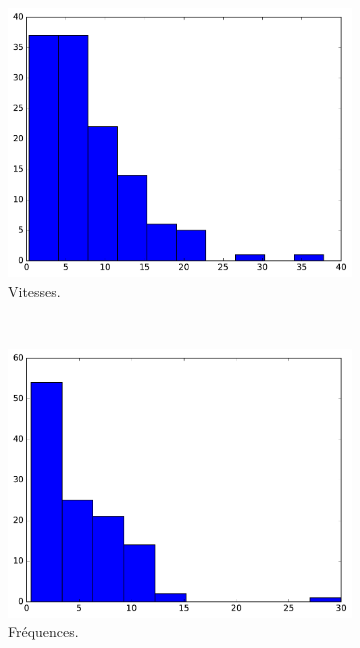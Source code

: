 \begin{appendices}
	\begin{figure}[htbp]
		\begin{subfigure}[t]{\subImgWclicks}
			\centering
			\includegraphics[width=\textwidth]{figures/ch3/oiseau_filteredSpeed}
			\caption{Vitesses.}
			\label{fig:oiseau_filteredSpeed}
		\end{subfigure}
		~
		\begin{subfigure}[t]{\subImgWclicks}
			\centering
			\includegraphics[width=\textwidth]{figures/ch3/oiseau_frequency}
			\caption{Fréquences.}
			\label{fig:oiseau_frequency}
		\end{subfigure}
		~
		\begin{subfigure}[t]{\subImgWclicks}

\end{subfigure}
\end{figure}
\end{appendices}

